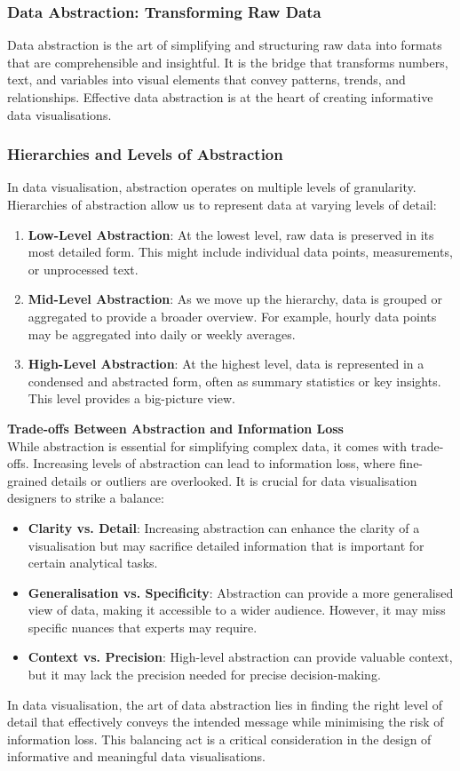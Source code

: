 \documentclass{article}\usepackage[]{graphicx}\usepackage[]{xcolor}
\begin{document}
\subsubsection{Data Abstraction: Transforming Raw Data}
Data abstraction is the art of simplifying and structuring raw data into formats that are comprehensible and insightful. It is the bridge that transforms numbers, text, and variables into visual elements that convey patterns, trends, and relationships. Effective data abstraction is at the heart of creating informative data visualisations.

\subsubsection{Hierarchies and Levels of Abstraction}
In data visualisation, abstraction operates on multiple levels of granularity. Hierarchies of abstraction allow us to represent data at varying levels of detail: 
\begin{enumerate}
    \item \textbf{Low-Level Abstraction}: At the lowest level, raw data is preserved in its most detailed form. This might include individual data points, measurements, or unprocessed text.
    \item \textbf{Mid-Level Abstraction}: As we move up the hierarchy, data is grouped or aggregated to provide a broader overview. For example, hourly data points may be aggregated into daily or weekly averages.
    \item \textbf{High-Level Abstraction}: At the highest level, data is represented in a condensed and abstracted form, often as summary statistics or key insights. This level provides a big-picture view.
\end{enumerate}

\textbf{Trade-offs Between Abstraction and Information Loss}\\
While abstraction is essential for simplifying complex data, it comes with trade-offs. Increasing levels of abstraction can lead to information loss, where fine-grained details or outliers are overlooked. It is crucial for data visualisation designers to strike a balance:
\begin{itemize}
    \item \textbf{Clarity vs. Detail}: Increasing abstraction can enhance the clarity of a visualisation but may sacrifice detailed information that is important for certain analytical tasks.
    \item \textbf{Generalisation vs. Specificity}: Abstraction can provide a more generalised view of data, making it accessible to a wider audience. However, it may miss specific nuances that experts may require.
    \item \textbf{Context vs. Precision}: High-level abstraction can provide valuable context, but it may lack the precision needed for precise decision-making.
\end{itemize}
In data visualisation, the art of data abstraction lies in finding the right level of detail that effectively conveys the intended message while minimising the risk of information loss. This balancing act is a critical consideration in the design of informative and meaningful data visualisations.
\end{document}
